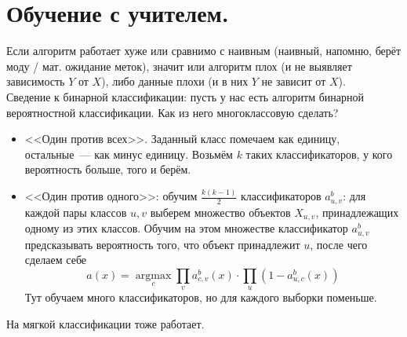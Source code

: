 \documentclass{article}
\begin{document}
    \section{Обучение с учителем.}
    Если алгоритм работает хуже или сравнимо с наивным (наивный, напомню, берёт моду / мат. ожидание меток), значит или алгоритм плох (и не выявляет зависимость $Y$ от $X$), либо данные плохи (и в них $Y$ не зависит от $X$).\\
    Сведение к бинарной классификации: пусть у нас есть алгоритм бинарной вероятностной классификации. Как из него многоклассовую сделать?
    \begin{itemize}
        \item <<Один против всех>>. Заданный класс помечаем как единицу, остальные~--- как минус единицу. Возьмём $k$ таких классификаторов, у кого вероятность больше, того и берём.
        \item <<Один против одного>>: обучим $\frac{k(k-1)}2$ классификаторов $a^b_{u,v}$: для каждой пары классов $u,v$ выберем множество объектов $X_{u,v}$, принадлежащих одному из этих классов. Обучим на этом множестве классификатор $a^b_{u,v}$ предсказывать вероятность того, что объект принадлежит $u$, после чего сделаем себе
        \[
        a(x)=\operatorname*{argmax}_c\prod\limits_va^b_{c,v}(x)\cdot\prod\limits_u(1-a^b_{u,c}(x))
        \]
        Тут обучаем много классификаторов, но для каждого выборки поменьше.
    \end{itemize}
    На мягкой классификации тоже работает.
\end{document}
